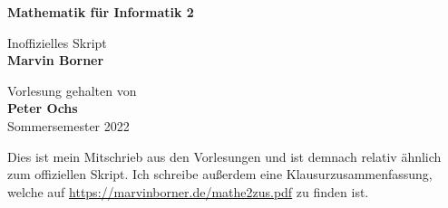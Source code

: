 \begin{titlepage}
	\begin{center}
		\vspace*{1cm}

		{\huge\textbf{Mathematik für Informatik 2}}

		\vspace{0.5cm}
		{\Large Inoffizielles Skript}\\
		\textbf{Marvin Borner}

		\vfill

		Vorlesung gehalten von\\
		\textbf{Peter Ochs}\\
		Sommersemester 2022
	\end{center}
\end{titlepage}

\pagebreak\hspace{0pt}\vfill\begin{center}{\Large Dies ist mein Mitschrieb aus den Vorlesungen und ist demnach relativ ähnlich zum offiziellen Skript. Ich schreibe außerdem eine Klausurzusammenfassung, welche auf \url{https://marvinborner.de/mathe2zus.pdf} zu finden ist.}\end{center}\vfill\hspace{0pt}\pagebreak
